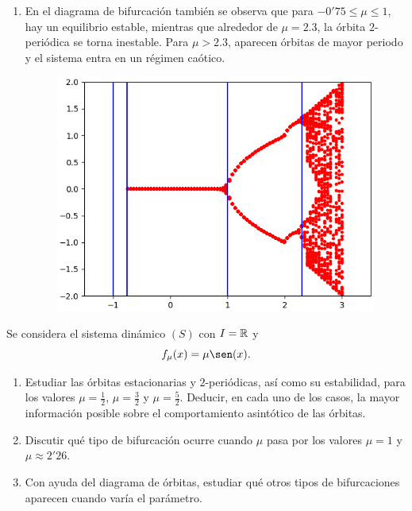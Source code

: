 \documentclass[11pt]{report}
\begin{document}
\begin{solution}
\begin{enumerate}
        \item En el diagrama de bifurcación también se observa que para $-0'75 \leq \mu \leq 1$, hay un equilibrio estable, mientras que alrededor de $\mu = 2.3$, la órbita $2$-periódica se torna inestable. Para $\mu > 2.3$, aparecen órbitas de mayor periodo y el sistema entra en un régimen caótico.
        \begin{figure}[H]
        \centering
        \includegraphics[scale = 0.8]{./img/Figure_4.png}
        \end{figure}
    \end{enumerate}
\end{solution}

\begin{exercise}
    Se considera el sistema dinámico $(S)$ con $I = \mathbb R$ y
    \[f_\mu (x) = \mu \sen(x).\]
    \begin{enumerate}
        \item Estudiar las órbitas estacionarias y $2$-periódicas, así como su estabilidad, para los valores $\mu = \frac{1}{2}$, $\mu = \frac{3}{2}$ y $\mu = \frac{5}{2}$. Deducir, en cada uno de los casos, la mayor información posible sobre el comportamiento asintótico de las órbitas.
        \item Discutir qué tipo de bifurcación ocurre cuando $\mu$ pasa por los valores $\mu = 1$ y $\mu \approx 2'26$.
        \item Con ayuda del diagrama de órbitas, estudiar qué otros tipos de bifurcaciones aparecen cuando varía el parámetro.
    \end{enumerate}
\end{exercise}
\end{document}
